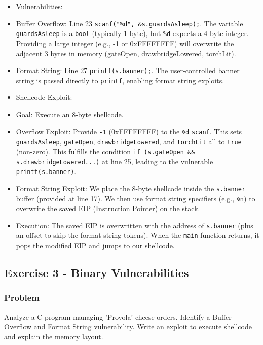 \documentclass{article}
\begin{document}
\begin{itemize}
    \item[\textbf{1.}] Vulnerabilities:
    \item Buffer Overflow: Line 23 \texttt{scanf("\%d", \&s.guardsAsleep);}. The variable \texttt{guardsAsleep} is a \texttt{bool} (typically 1 byte), but \texttt{\%d} expects a 4-byte integer. Providing a large integer (e.g., -1 or 0xFFFFFFFF) will overwrite the adjacent 3 bytes in memory (gateOpen, drawbridgeLowered, torchLit).
    \item Format String: Line 27 \texttt{printf(s.banner);}. The user-controlled banner string is passed directly to \texttt{printf}, enabling format string exploits.

    \item[\textbf{2.}] Shellcode Exploit:
    \item Goal: Execute an 8-byte shellcode.
    \item Overflow Exploit: Provide \texttt{-1} (0xFFFFFFFF) to the \texttt{\%d} \texttt{scanf}. This sets \texttt{guardsAsleep}, \texttt{gateOpen}, \texttt{drawbridgeLowered}, and \texttt{torchLit} all to \texttt{true} (non-zero). This fulfills the condition \texttt{if (s.gateOpen \&\& s.drawbridgeLowered...)} at line 25, leading to the vulnerable \texttt{printf(s.banner)}.
    \item Format String Exploit: We place the 8-byte shellcode inside the \texttt{s.banner} buffer (provided at line 17). We then use format string specifiers (e.g., \texttt{\%n}) to overwrite the saved EIP (Instruction Pointer) on the stack.
    \item Execution: The saved EIP is overwritten with the address of \texttt{s.banner} (plus an offset to skip the format string tokens). When the \texttt{main} function returns, it pops the modified EIP and jumps to our shellcode.
\end{itemize}

\subsection{Exercise 3 - Binary Vulnerabilities}
\subsubsection*{Problem}
Analyze a C program managing 'Provola' cheese orders. Identify a Buffer Overflow and Format String vulnerability. Write an exploit to execute shellcode and explain the memory layout.
\end{document}
